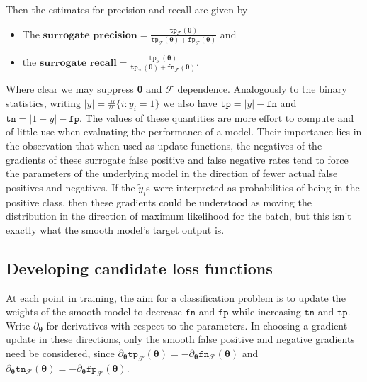 \documentclass[10pt,a4paper]{article}
\begin{document}
Then the estimates for precision and recall are given by
\begin{itemize}
  \item The $\textbf{surrogate precision}=\frac{\texttt{tp}_\mathcal F(\boldsymbol\theta)}{\texttt{tp}_\mathcal F(\boldsymbol\theta)+\texttt{fp}_\mathcal F(\boldsymbol\theta)}$ and
  \item the $\textbf{surrogate recall}=\frac{\texttt{tp}_\mathcal F(\boldsymbol\theta)}{\texttt{tp}_\mathcal F(\boldsymbol\theta)+\texttt{fn}_\mathcal F(\boldsymbol\theta)}$.
\end{itemize}
Where clear we may suppress $\boldsymbol\theta$ and $\mathcal F$ dependence.
Analogously to the binary statistics, writing $|y|=\#\{i:y_i=1\}$ we also have $\texttt{tp}=|y|-\texttt{fn}$ and $\texttt{tn}=|1-y|-\texttt{fp}$.
The values of these quantities are more effort to compute and of little use when evaluating the performance of a model.
Their importance lies in the observation that when used as update functions, the negatives of the gradients of these surrogate false positive and false negative rates tend to force the parameters of the underlying model in the direction of fewer actual false positives and negatives.
If the $\tilde y_i$s were interpreted as probabilities of being in the positive class, then these gradients could be understood as moving the distribution in the direction of maximum likelihood for the batch, but this isn't exactly what the smooth model's target output is.
\subsection{Developing candidate loss functions}
At each point in training, the aim for a classification problem is to update the weights of the smooth model to decrease $\texttt{fn}$ and $\texttt{fp}$ while increasing $\texttt{tn}$ and $\texttt{tp}$.
Write $\partial_{\boldsymbol\theta}$ for derivatives with respect to the parameters.
In choosing a gradient update in these directions, only the smooth false positive and negative gradients need be considered, since $\partial_{\boldsymbol\theta}\texttt{tp}_{\mathcal F}(\boldsymbol\theta)=-\partial_{\boldsymbol\theta}\texttt{fn}_{\mathcal F}(\boldsymbol\theta)$ and $\partial_{\boldsymbol\theta}\texttt{tn}_{\mathcal F}(\boldsymbol\theta)=-\partial_{\boldsymbol\theta}\texttt{fp}_{\mathcal F}(\boldsymbol\theta)$.
\end{document}

